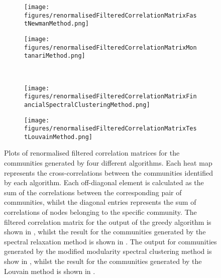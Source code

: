\begin{figure}
\centering
	\begin{subfigure}{.5\textwidth}
		\centering
		\texttt{[image: figures/renormalisedFilteredCorrelationMatrixFastNewmanMethod.png]}
		\caption{}
		\label{fig:renormalisedFilteredCorrelationMatrixGreedyAlgorithm}
	\end{subfigure}%
	\begin{subfigure}{.5\textwidth}
		\centering
		\texttt{[image: figures/renormalisedFilteredCorrelationMatrixMontanariMethod.png]}
		\caption{}
		\label{fig:renormalisedFilteredCorrelationMatrixSpectralRelaxation}
	\end{subfigure}\\
	\begin{subfigure}{.5\textwidth}
		\centering
		\texttt{[image: figures/renormalisedFilteredCorrelationMatrixFinancialSpectralClusteringMethod.png]}
		\caption{}
		\label{fig:renormalisedFilteredCorrelationMatrixSpectralClustering}
	\end{subfigure}%
	\begin{subfigure}{.5\textwidth}
		\centering
		\texttt{[image: figures/renormalisedFilteredCorrelationMatrixTestLouvainMethod.png]}
		\caption{}
		\label{fig:renormalisedFilteredCorrelationMatrixTestLouvainMethod}
	\end{subfigure}
	\caption[Plots of renormalised filtered correlation matrices for the communities generated by four different algorithms.]{\label{fig:renormalisedFilteredCorrelationMatrices} Plots of renormalised filtered correlation matrices for the communities generated by four different algorithms. Each heat map represents the cross-correlations between the communities identified by each algorithm. Each off-diagonal element is calculated as the sum of the correlations between the corresponding pair of communities, whilst the diagonal entries represents the sum of correlations of nodes belonging to the specific community. The filtered correlation matrix for the output of the greedy algorithm is shown in , whilst the result for the communities generated by the spectral relaxation method is shown in . The output for communities generated by the modified modularity spectral clustering method is show in , whilst the result for the communities generated by the Louvain method is shown in .}
\end{figure}

